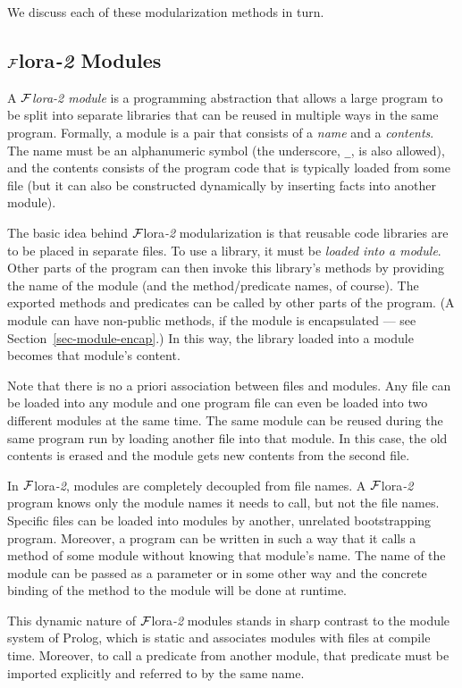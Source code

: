 \documentclass[11pt]{article}
\newcommand{\FLSYSTEM}{{\mbox{\sc ${\cal F}${lora}\rm\emph{-2}}}\xspace}
\begin{document}
We discuss each of these modularization methods in turn.


\subsection{\FLSYSTEM Modules} \label{sec:flora-modules}

A \emph{\FLSYSTEM module} is a programming abstraction that allows a large
program to be split into separate libraries that can be reused in multiple
ways in the same program. Formally, a module is a pair that consists of a
\emph{name} and a \emph{contents}. The name must be an alphanumeric symbol
(the underscore, {\tt \_}, is also allowed), and the contents consists of
the program code that is typically loaded from some file (but it can also
be constructed dynamically by inserting facts
into another module).

The basic idea behind \FLSYSTEM modularization is that reusable code libraries
are to be placed in separate files.  To use a library, it must be
\emph{loaded into a module}. Other parts of the program can then invoke
this library's methods by providing the name of the module (and the
method/predicate names, of course).  
The exported methods and predicates can be called by other
parts of the program. (A module can have non-public methods, if the module
is encapsulated ---
see Section~\ref{sec-module-encap}.)
In this way, the library loaded into a module becomes that module's content.

Note that there is no a priori association between files and modules.  Any
file can be loaded into any module and one program file can even be loaded
into two different modules at the same time. The same module can be reused
during the same program run by loading another file into that module. In
this case, the old contents is erased and the module gets new contents from
the second file.

In \FLSYSTEM, modules are completely decoupled from file names. A \FLSYSTEM
program knows only the module names it needs to call, but not the file
names. Specific files can be loaded into modules by another, unrelated
bootstrapping program. Moreover, a program can be written in such a way
that it calls a method of some module without knowing that module's name.
The name of the module can be passed as a parameter or in some other way
and the concrete binding of the method to the module will be done at
runtime.

This dynamic nature of \FLSYSTEM modules stands in sharp contrast to the module
system of Prolog, which is static and associates modules with files at compile
time. Moreover, to call a predicate from another module, that predicate
must be imported explicitly and referred to by the same name.
\end{document}
